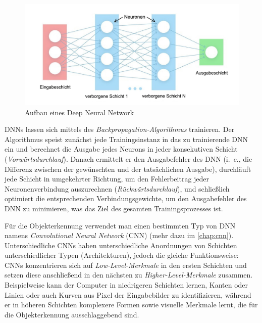 \begin{figure}[!hb]
	\centering
	\includegraphics[width=\linewidth]{images/DNN}
	\caption{Aufbau eines Deep Neural Network \protect\cite{AufbauDNN}}
	\label{fig:DNN}
\end{figure}

DNNs lassen sich mittels des \emph{Backpropagation-Algorithmus} \cite{backpropapaper,Goodfellow-et-al-2016} trainieren. Der Algorithmus speist zunächst jede Trainingsinstanz in das zu trainierende DNN ein und berechnet die Ausgabe jedes Neurons in jeder konsekutiven Schicht (\emph{Vorwärtsdurchlauf}). Danach ermittelt er den Ausgabefehler des DNN (i.~e., die Differenz zwischen der gewünschten und der tatsächlichen Ausgabe), durchläuft jede Schicht in umgekehrter Richtung, um den Fehlerbeitrag jeder Neuronenverbindung auszurechnen (\emph{Rückwärtsdurchlauf}), und schließlich optimiert die entsprechenden Verbindungsgewichte, um den Ausgabefehler des DNN zu minimieren, was das Ziel des gesamten Trainingsprozesses ist.

Für die Objekterkennung verwendet man einen bestimmten Typ von DNN namens \emph{Convolutional Neural Network} (CNN) (mehr dazu im \autoref{chap:cnn}). Unterschiedliche CNNs haben unterschiedliche Anordnungen von Schichten unterschiedlicher Typen (Architekturen), jedoch die gleiche Funktionsweise: CNNs konzentrieren sich auf \emph{Low-Level-Merkmale} in den ersten Schichten und setzen diese anschließend in den nächsten zu \emph{Higher-Level-Merkmale} zusammen. Beispielweise kann der Computer in niedrigeren Schichten lernen, Kanten oder Linien oder auch Kurven aus Pixel der Eingabebilder zu identifizieren, während er in höheren Schichten komplexere Formen sowie visuelle Merkmale lernt, die für die Objekterkennung ausschlaggebend sind.

